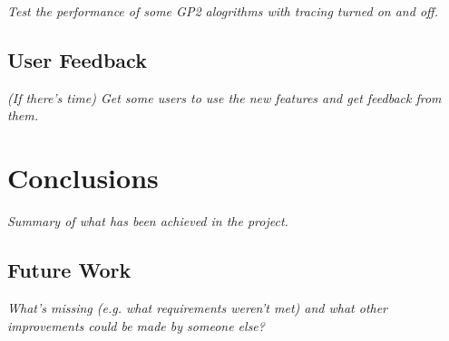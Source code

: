 \documentclass[authoryearcitations]{UoYCSproject}
\begin{document}
\emph{Test the performance of some GP2 alogrithms with tracing turned on and off.}


\section{User Feedback}
\label{sec:UserFeedback}

\emph{(If there's time) Get some users to use the new features and get feedback
from them.}

\clearpage


\chapter{Conclusions}
\label{cha:Conclusions}

\emph{Summary of what has been achieved in the project.}


\section{Future Work}
\label{sec:FutureWork}

\emph{What's missing (e.g. what requirements weren't met) and what other
improvements could be made by someone else?}

\clearpage



\end{document}
